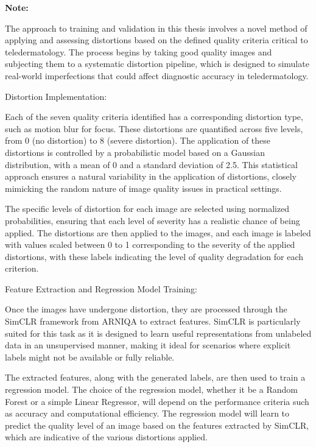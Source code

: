 \vspace{\baselineskip}
\noindent
\textbf{Note:} \par
\vspace{\baselineskip}
\noindent
The approach to training and validation in this thesis involves a novel method of applying and assessing distortions based on the defined quality criteria critical to teledermatology. The process begins by taking good quality images and subjecting them to a systematic distortion pipeline, which is designed to simulate real-world imperfections that could affect diagnostic accuracy in teledermatology.\par
\noindent
Distortion Implementation:\par
Each of the seven quality criteria identified has a corresponding distortion type, such as motion blur for focus. These distortions are quantified across five levels, from 0 (no distortion) to 8 (severe distortion). The application of these distortions is controlled by a probabilistic model based on a Gaussian distribution, with a mean of 0 and a standard deviation of 2.5. This statistical approach ensures a natural variability in the application of distortions, closely mimicking the random nature of image quality issues in practical settings.\par
\noindent
The specific levels of distortion for each image are selected using normalized probabilities, ensuring that each level of severity has a realistic chance of being applied. The distortions are then applied to the images, and each image is labeled with values scaled between 0 to 1 corresponding to the severity of the applied distortions, with these labels indicating the level of quality degradation for each criterion.\par
\noindent
Feature Extraction and Regression Model Training:\par
Once the images have undergone distortion, they are processed through the SimCLR framework from ARNIQA to extract features. SimCLR is particularly suited for this task as it is designed to learn useful representations from unlabeled data in an unsupervised manner, making it ideal for scenarios where explicit labels might not be available or fully reliable.\par
\noindent
The extracted features, along with the generated labels, are then used to train a regression model. The choice of the regression model, whether it be a Random Forest or a simple Linear Regressor, will depend on the performance criteria such as accuracy and computational efficiency. The regression model will learn to predict the quality level of an image based on the features extracted by SimCLR, which are indicative of the various distortions applied.\par
